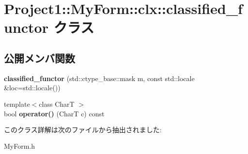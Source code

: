 \hypertarget{class_project1_1_1_my_form_1_1clx_1_1classified__functor}{}\section{Project1\+:\+:My\+Form\+:\+:clx\+:\+:classified\+\_\+functor クラス}
\label{class_project1_1_1_my_form_1_1clx_1_1classified__functor}
\subsection*{公開メンバ関数}
\begin{DoxyCompactItemize}
\item 
\mbox{\label{class_project1_1_1_my_form_1_1clx_1_1classified__functor_aa57ebeb1e93b96b0c0fb3f90aa3459d0}} 
{\bfseries classified\+\_\+functor} (std\+::ctype\+\_\+base\+::mask m, const std\+::locale \&loc=std\+::locale())
\item 
\mbox{\label{class_project1_1_1_my_form_1_1clx_1_1classified__functor_aaf89c98c3bcbe1f6d696d3f229fb8d2b}} 
{\footnotesize template$<$class CharT $>$ }\\bool {\bfseries operator()} (CharT c) const
\end{DoxyCompactItemize}


このクラス詳解は次のファイルから抽出されました\+:\begin{DoxyCompactItemize}
\item 
My\+Form.\+h\end{DoxyCompactItemize}
